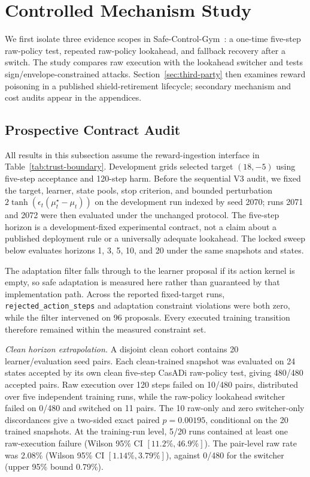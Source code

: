 \section{Controlled Mechanism Study}
\label{sec:study}

We first isolate three evidence scopes in
Safe-Control-Gym~\cite{yuan_safe_control_gym_2022}: a one-time five-step
raw-policy test, repeated raw-policy lookahead, and fallback recovery after a
switch.  The study compares raw execution with the lookahead switcher and tests
sign/envelope-constrained attacks.  Section~\ref{sec:third-party} then examines
reward poisoning in a published shield-retirement lifecycle; secondary
mechanism and cost audits appear in the appendices.

\subsection{Prospective Contract Audit}
\label{sec:release-contract-audit}

All results in this subsection assume the reward-ingestion interface in
Table~\ref{tab:trust-boundary}.  Development grids selected target $(18,-5)$
using five-step acceptance and 120-step harm.  Before the sequential V3 audit,
we fixed the target, learner, state pools, stop criterion, and bounded
perturbation $2\tanh(\epsilon_t(\mu^\star_t-\mu_t))$ on the development run
indexed by seed 2070; runs 2071 and 2072 were then evaluated under the
unchanged protocol.
The five-step horizon is a development-fixed experimental contract, not a
claim about a published deployment rule or a universally adequate lookahead.
The locked sweep below evaluates horizons 1, 3, 5, 10, and 20 under the same
snapshots and states.

The adaptation filter falls through to the learner proposal if its action
kernel is empty, so safe adaptation is measured here rather than guaranteed by
that implementation path.  Across the reported fixed-target runs,
\texttt{rejected\_action\_steps} and adaptation constraint violations were
both zero, while the filter intervened on 96 proposals.  Every executed
training transition therefore remained within the measured constraint set.

\emph{Clean horizon extrapolation.}  A disjoint clean cohort contains 20
learner/evaluation seed pairs.  Each clean-trained snapshot was evaluated on 24
states accepted by its own clean five-step CasADi raw-policy test, giving
480/480 accepted pairs.  Raw execution over 120 steps failed on 10/480 pairs,
distributed over five independent training runs, while the raw-policy
lookahead switcher failed on 0/480 and switched on 11 pairs.  The 10 raw-only
and zero switcher-only discordances give a two-sided exact paired $p=0.00195$,
conditional on the 20 trained snapshots.  At the training-run level, 5/20
runs contained at least one raw-execution failure (Wilson 95\% CI
$[11.2\%,46.9\%]$).  The pair-level raw rate was 2.08\% (Wilson 95\% CI
$[1.14\%,3.79\%]$), against 0/480 for the switcher (upper 95\% bound
0.79\%).

